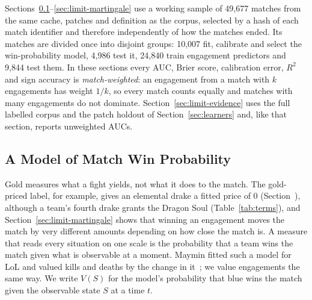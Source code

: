 Sections~\ref{sec:limit-value}--\ref{sec:limit-martingale} use a working sample of 49,677 matches from
the same cache, patches and definition as the corpus, selected by a hash of each match identifier and
therefore independently of how the matches ended. Its matches are divided once into disjoint groups:
10,007 fit, calibrate and select the win-probability model, 4,986 test it, 24,840 train engagement
predictors and 9,844 test them. In these sections every AUC, Brier score, calibration error, $R^2$ and
sign accuracy is \emph{match-weighted}: an engagement from a match with $k$ engagements has weight $1/k$,
so every match counts equally and matches with many engagements do not dominate.
Section~\ref{sec:limit-evidence} uses the full labelled corpus and the patch holdout of
Section~\ref{sec:learners} and, like that section, reports unweighted AUCs.

\subsection{A Model of Match Win Probability}\label{sec:limit-value}

Gold measures what a fight yields, not what it does to the match. The gold-priced label, for example,
gives an elemental drake a fitted price of 0 (Section~), although a team's fourth drake
grants the Dragon Soul (Table~\ref{tab:terms}), and Section~\ref{sec:limit-martingale} shows that winning
an engagement moves the match by very different amounts depending on how close the match is. A measure
that reads every situation on one scale is the probability that a team wins the match given what is
observable at a moment. Maymin fitted such a model for LoL and
valued kills and deaths by the change in it~\cite{maymin2021smart}; we value engagements the same way.
We write $V(S)$ for the model's probability that blue wins the match given the observable state $S$ at a
time $t$.

